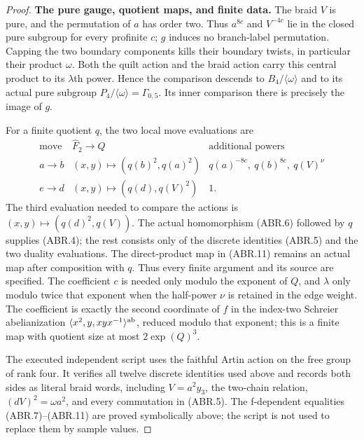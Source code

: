 \begin{proof}
\par\medskip\noindent\textbf{The pure gauge, quotient maps, and finite data.}\quad
The braid $V$ is pure, and the permutation of $a$ has order two.
Thus $a^{8c}$ and $V^{-4c}$ lie in the closed pure subgroup for
every profinite $c$; $g$ induces no branch-label permutation.
Capping the two boundary components kills their boundary twists,
in particular their product $\omega$.  Both the quilt action
and the braid action carry this central product to its
$\lambda$th power.  Hence the comparison descends to
$B_4/\langle\omega\rangle$ and to its actual pure subgroup
$P_4/\langle\omega\rangle=\Gamma_{0,5}$.
Its inner comparison there is precisely the image of $g$.

For a finite quotient $q$, the two local move evaluations are
\[
\begin{array}{c|c|c}
\text{move}&\widehat F_2\longrightarrow Q&\text{additional powers}\\ \hline
 a\to b&(x,y)\longmapsto(q(b)^2,q(a)^2)&q(a)^{-8c},\ q(b)^{8c},\ q(V)^\nu\\
 e\to d&(x,y)\longmapsto(q(d),q(V)^2)&1.
\end{array}                                                    \tag{ABR.12}
\]
The third evaluation needed to compare the actions is
$(x,y)\mapsto(q(d)^2,q(V))$.  The actual homomorphism
(ABR.6) followed by $q$ supplies (ABR.4); the rest consists only
of the discrete identities (ABR.5) and the two duality evaluations.
The direct-product map in (ABR.11) remains an actual map after
composition with $q$.  Thus every finite argument and its source
are specified.  The coefficient $c$ is needed only modulo the
exponent of $Q$, and $\lambda$ only modulo twice that exponent
when the half-power $\nu$ is retained in the edge weight.
The coefficient is exactly the second coordinate of $f$ in the
index-two Schreier abelianization
$\langle x^2,y,xyx^{-1}\rangle^{\rm ab}$, reduced modulo that
exponent; this is a finite map with quotient size at most
$2\exp(Q)^3$.

The executed independent script
uses the faithful Artin action on the free group of rank four.
It verifies all twelve discrete identities used above and
records both sides as literal braid words, including
$V=a^2y_3$, the two-chain relation, $(dV)^2=\omega a^2$,
and every commutation in (ABR.5).  The f-dependent equalities
(ABR.7)--(ABR.11) are proved symbolically above; the script is not
used to replace them by sample values.


\end{proof}
